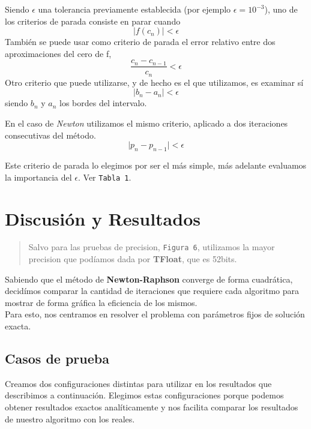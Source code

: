 \documentclass[a4paper]{article}
\begin{document}
Siendo $\epsilon$ una tolerancia previamente establecida (por ejemplo $\epsilon = 10^{-3}$), uno de los criterios de parada consiste en parar cuando 
\begin{equation}|f(c_n)| < \epsilon \end{equation}
También se puede usar como criterio de parada el error relativo entre dos aproximaciones del cero de f, 
\begin{equation}\frac{c_n - c_{n-1}}{c_n} < \epsilon \end{equation}
Otro criterio que puede utilizarse, y de hecho es el que utilizamos, es examinar sí \begin{equation}\vert{b_n - a_n}\vert < \epsilon\end{equation} siendo $b_n$ y $a_n$ los bordes del intervalo.

En el caso de \textit{Newton} utilizamos el mismo criterio, aplicado a dos iteraciones consecutivas del método. \begin{equation}\vert{p_n - p_{n-1}}\vert < \epsilon\end{equation}





Este criterio de parada lo elegimos por ser el más simple, más adelante evaluamos la importancia del $\epsilon$. Ver \texttt{Tabla 1}.

\newpage

\section{Discusión y Resultados}
\begin{quote}
Salvo para las pruebas de precision, \texttt{Figura 6}, utilizamos la mayor precision que podíamos dada por \textbf{TFloat}, que es 52bits.
\end{quote}
\vspace{1em}

Sabiendo que el método de \textbf{Newton-Raphson} converge de forma cuadrática, decidímos comparar la cantidad de iteraciones que requiere cada algoritmo para mostrar de forma gráfica la eficiencia de los mismos. \\

Para esto, nos centramos en resolver el problema con parámetros fijos de solución exacta.

\subsection{Casos de prueba}
 Creamos dos configuraciones distintas para utilizar en los resultados que describimos a continuación.
Elegimos estas configuraciones porque podemos obtener resultados exactos analíticamente y nos facilita comparar los resultados de nuestro algoritmo con los reales.
\end{document}
